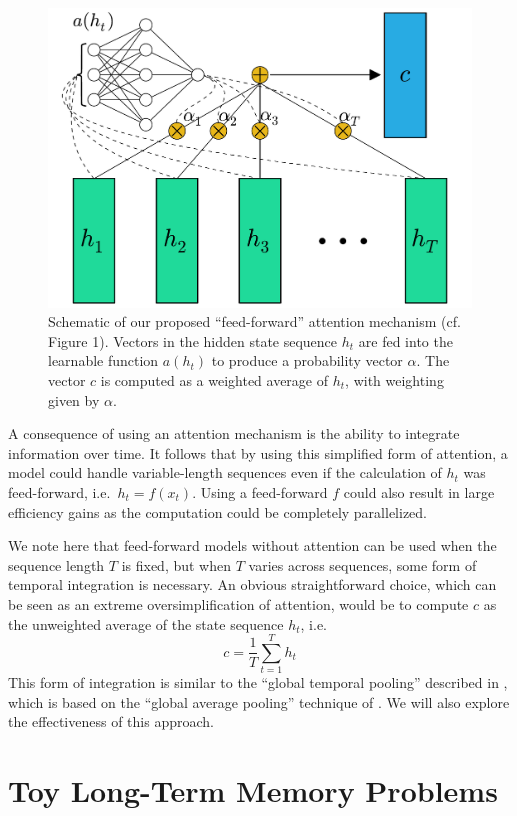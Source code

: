 \documentclass{article} %
\begin{document}
\begin{figure}
  \centering
  \includegraphics[width=.8\textwidth]{schematic.pdf}
  \caption{Schematic of our proposed ``feed-forward'' attention mechanism (cf.\ \cite{cho2015introduction} Figure 1).  Vectors in the hidden state sequence $h_t$ are fed into the learnable function $a(h_t)$ to produce a probability vector $\alpha$.  The vector $c$ is computed as a weighted average of $h_t$, with weighting given by $\alpha$.}
  \label{fig:schematic}
\end{figure}

A consequence of using an attention mechanism is the ability to integrate information over time.
It follows that by using this simplified form of attention, a model could handle variable-length sequences even if the calculation of $h_t$ was feed-forward, i.e.\ $h_t = f(x_t)$.
Using a feed-forward $f$ could also result in large efficiency gains as the computation could be completely parallelized.

We note here that feed-forward models without attention can be used when the sequence length $T$ is fixed, but when $T$ varies across sequences, some form of temporal integration is necessary.
An obvious straightforward choice, which can be seen as an extreme oversimplification of attention, would be to compute $c$ as the unweighted average of the state sequence $h_t$, i.e.
\begin{equation}
\label{eq:unweighted}
c = \frac{1}{T}\sum_{t = 1}^T h_t
\end{equation}
This form of integration is similar to the ``global temporal pooling'' described in \cite{dieleman2014recommending}, which is based on the ``global average pooling'' technique of \cite{lin2014network}.
We will also explore the effectiveness of this approach.

\section{Toy Long-Term Memory Problems}
\end{document}
